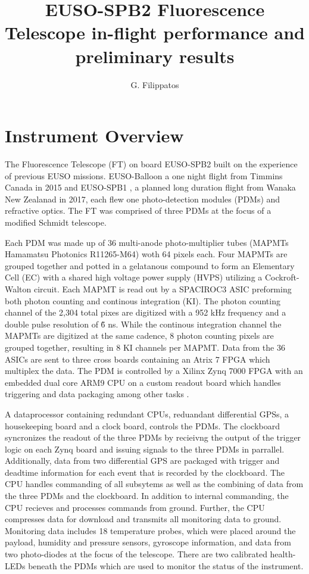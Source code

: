 \documentclass[a4paper,11pt]{article}
\title{EUSO-SPB2 Fluorescence Telescope in-flight performance and preliminary results }
\author*[a]{G. Filippatos}
\affiliation[a]{Colorado School of Mines, Golden, USA}
\begin{document}
\maketitle

\section{Instrument Overview}

The Fluorescence Telescope (FT) on board EUSO-SPB2 built on the experience of previous EUSO missions.
EUSO-Balloon \citep{EUSO-Ballon} a one night flight from Timmins Canada in 2015 and EUSO-SPB1 \citep{SPB1}, a planned long duration flight from Wanaka New Zealanad in 2017, each flew one photo-detection modules (PDMs) and refractive optics.
The FT was comprised of three PDMs at the focus of a modified Schmidt telescope. 

Each PDM was made up of 36 multi-anode photo-multiplier tubes (MAPMTs Hamamatsu Photonics R11265-M64) woth 64 pixels each. 
Four MAPMTs are grouped together and potted in a gelatanous compound to form an Elementary Cell (EC) with a shared high voltage power supply (HVPS) utilizing a Cockroft-Walton circuit. 
Each MAPMT is read out by a SPACIROC3 ASIC preforming both photon counting and continous integration (KI). 
The photon counting channel of the 2,304 total pixes are digitized with a 952 kHz frequency and a double pulse resolution of \~6 ns.
While the continous integration channel the MAPMTs are digitized at the same cadence, 8 photon counting pixels are grouped together, resulting in 8 KI channels per MAPMT.
Data from the 36 ASICs are sent to three cross boards containing an Atrix 7 FPGA which multiplex the data.
The PDM is controlled by a Xilinx Zynq 7000 FPGA with an embedded dual core ARM9 CPU on a custom readout board which handles triggering and data packaging among other tasks \citep{SPB2Trigger}. 

A dataprocessor containing redundant CPUs, reduandant differential GPSs, a housekeeping board and a clock board, controls the PDMs. 
The clockboard syncronizes the readout of the three PDMs by recieivng the output of the trigger logic on each Zynq board and issuing signals to the three PDMs in parrallel. 
Additionally, data from two differential GPS are packaged with trigger and deadtime information for each event that is recorded by the clockboard. 
The CPU handles commanding of all subsytems as well as the combining of data from the three PDMs and the clockboard. 
In addition to internal commanding, the CPU recieves and processes commands from ground. 
Further, the CPU compresses data for download and transmits all monitoring data to ground. 
Monitoring data includes 18 temperature probes, which were placed around the payload, humidity and pressure sensors, gyroscope information, and data from two photo-diodes at the focus of the telescope. 
There are two calibrated health-LEDs beneath the PDMs which are used to monitor the status of the instrument. 
\end{document}
